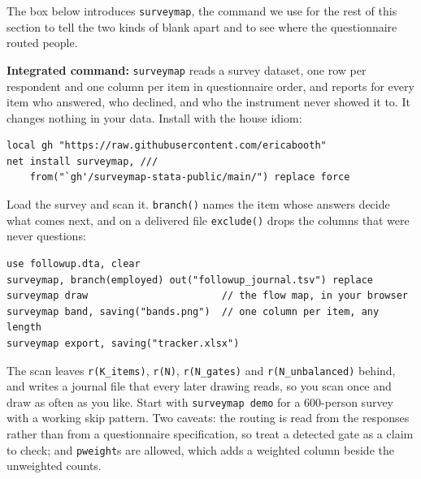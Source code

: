 The box below introduces \texttt{surveymap}, the command we use for the rest of this section to tell the two kinds of blank apart and to see where the questionnaire routed people.

\begin{kaobox}[frametitle=Package Integration: \texttt{surveymap}]
\textbf{Integrated command:} \texttt{surveymap} reads a survey dataset, one row per respondent and one column per item in questionnaire order, and reports for every item who answered, who declined, and who the instrument never showed it to. It changes nothing in your data. Install with the house idiom:
\par
{\footnotesize
\begin{verbatim}
local gh "https://raw.githubusercontent.com/ericabooth"
net install surveymap, ///
    from("`gh'/surveymap-stata-public/main/") replace force
\end{verbatim}
}
Load the survey and scan it. \texttt{branch()} names the item whose answers decide what comes next, and on a delivered file \texttt{exclude()} drops the columns that were never questions:
\par
{\footnotesize
\begin{verbatim}
use followup.dta, clear
surveymap, branch(employed) out("followup_journal.tsv") replace
surveymap draw                       // the flow map, in your browser
surveymap band, saving("bands.png")  // one column per item, any length
surveymap export, saving("tracker.xlsx")
\end{verbatim}
}
The scan leaves \texttt{r(K\_items)}, \texttt{r(N)}, \texttt{r(N\_gates)} and \texttt{r(N\_unbalanced)} behind, and writes a journal file that every later drawing reads, so you scan once and draw as often as you like. Start with \texttt{surveymap demo} for a 600-person survey with a working skip pattern. Two caveats: the routing is read from the responses rather than from a questionnaire specification, so treat a detected gate as a claim to check; and \texttt{pweight}s are allowed, which adds a weighted column beside the unweighted counts.
\end{kaobox}

